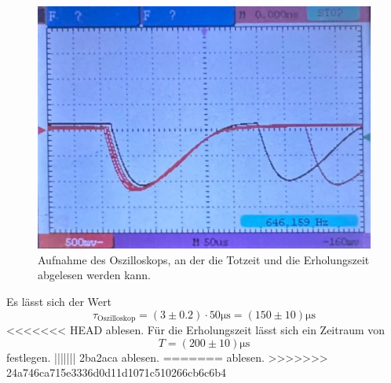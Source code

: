 \begin{figure}[H]
    \centering
	\includegraphics[width=0.5\linewidth]{content/grafik/zeit_1.jpg}
	\caption{Aufnahme des Oszilloskops, an der die Totzeit und die Erholungszeit abgelesen werden kann.}
	\label{fig:totzeit}
\end{figure}
Es lässt sich der Wert 
\begin{equation*}
    \tau_\text{Oszilloskop} = \left(3 \pm 0.2 \right) \cdot 50 \si{\micro\second} = \left(150 \pm  10\right) \si{\micro\second}
\end{equation*}
<<<<<<< HEAD
ablesen. Für die Erholungszeit lässt sich ein Zeitraum von
\begin{equation*}
    T = \left(200 \pm  10\right) \si{\micro\second}
\end{equation*}
festlegen.
||||||| 2ba2aca
ablesen.
=======
ablesen.
>>>>>>> 24a746ca715e3336d0d11d1071c510266cb6c6b4
